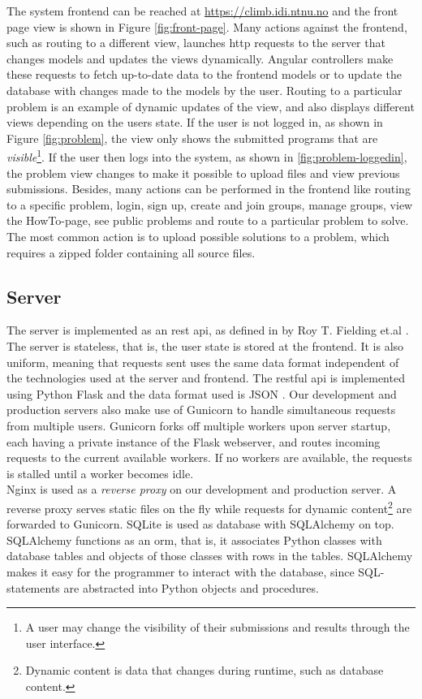 The system frontend can be reached at \url{https://climb.idi.ntnu.no} and the front page view is shown in Figure \ref{fig:front-page}. Many actions against the frontend, such as routing to a different view, launches \gls{http} requests to the server that changes models and updates the views dynamically. Angular controllers make these requests to fetch up-to-date data to the frontend models or to update the database with changes made to the models by the user. Routing to a particular problem is an example of dynamic updates of the view, and also displays different views depending on the users state. If the user is not logged in, as shown in Figure \ref{fig:problem}, the view only shows the submitted programs that are \textit{visible}\footnote{A user may change the visibility of their submissions and results through the user interface.}. If the user then logs into the system, as shown in \ref{fig:problem-loggedin}, the problem view changes to make it possible to upload files and view previous submissions. Besides, many actions can be performed in the frontend like routing to a specific problem, login, sign up, create and join groups, manage groups, view the HowTo-page, see public problems and route to a particular problem to solve. The most common action is to upload possible solutions to a problem, which requires a zipped folder containing all source files. \\

\subsection{Server}
\label{subsec:cmb-arch-server}
The server is implemented as an \gls{rest} \gls{api}, as defined in by Roy T. Fielding et.al \cite{a:rtf}. The server is stateless, that is, the user state is stored at the frontend. It is also uniform, meaning that requests sent uses the same data format independent of the technologies used at the server and frontend. The \gls{rest}ful \gls{api} is implemented using Python Flask \cite{FLASK} and the data format used is JSON \cite{JSON}. Our development and production servers also make use of Gunicorn \cite{GUNICORN} to handle simultaneous requests from multiple users. Gunicorn forks off multiple workers upon server startup, each having a private instance of the Flask webserver, and routes incoming requests to the current available workers. If no workers are available, the requests is stalled until a worker becomes idle. \\

Nginx \cite{NGINX} is used as a \textit{reverse proxy} on our development and production server. A reverse proxy serves static files on the fly while requests for dynamic content\footnote{Dynamic content is data that changes during runtime, such as database content.} are forwarded to Gunicorn. SQLite \cite{SQLITE} is used as database with SQLAlchemy \cite{SQLALCHEMY} on top. SQLAlchemy functions as an \gls{orm}, that is, it associates Python classes with database tables and objects of those classes with rows in the tables. SQLAlchemy makes it easy for the programmer to interact with the database, since SQL-statements are abstracted into Python objects and procedures. \\

